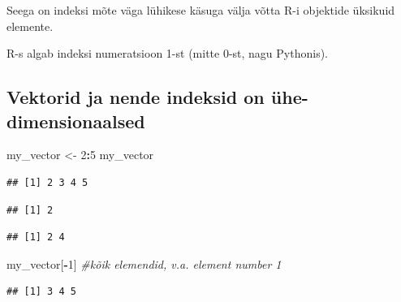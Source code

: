 \documentclass[]{book}
\newenvironment{Shaded}{\begin{snugshade}}{\end{snugshade}}
\newcommand{\KeywordTok}[1]{\textcolor[rgb]{0.13,0.29,0.53}{\textbf{#1}}}
\newcommand{\DecValTok}[1]{\textcolor[rgb]{0.00,0.00,0.81}{#1}}
\newcommand{\StringTok}[1]{\textcolor[rgb]{0.31,0.60,0.02}{#1}}
\newcommand{\CommentTok}[1]{\textcolor[rgb]{0.56,0.35,0.01}{\textit{#1}}}
\newcommand{\OperatorTok}[1]{\textcolor[rgb]{0.81,0.36,0.00}{\textbf{#1}}}
\newcommand{\NormalTok}[1]{#1}
\begin{document}
Seega on indeksi mõte väga lühikese käsuga välja võtta R-i objektide
üksikuid elemente.

R-s algab indeksi numeratsioon 1-st (mitte 0-st, nagu Pythonis).

\subsection{Vektorid ja nende indeksid on
ühe-dimensionaalsed}\label{vektorid-ja-nende-indeksid-on-uhe-dimensionaalsed}

\begin{Shaded}
\begin{Highlighting}[]
\NormalTok{my_vector <-}\StringTok{ }\DecValTok{2}\OperatorTok{:}\DecValTok{5} 
\NormalTok{my_vector}
\end{Highlighting}
\end{Shaded}

\begin{verbatim}
## [1] 2 3 4 5
\end{verbatim}

\begin{Shaded}
\end{Shaded}

\begin{verbatim}
## [1] 2
\end{verbatim}

\begin{Shaded}
\end{Shaded}

\begin{verbatim}
## [1] 2 4
\end{verbatim}

\begin{Shaded}
\begin{Highlighting}[]
\NormalTok{my_vector[}\OperatorTok{-}\DecValTok{1}\NormalTok{] }\CommentTok{#kõik elemendid, v.a. element number 1}
\end{Highlighting}
\end{Shaded}

\begin{verbatim}
## [1] 3 4 5
\end{verbatim}
\end{document}
